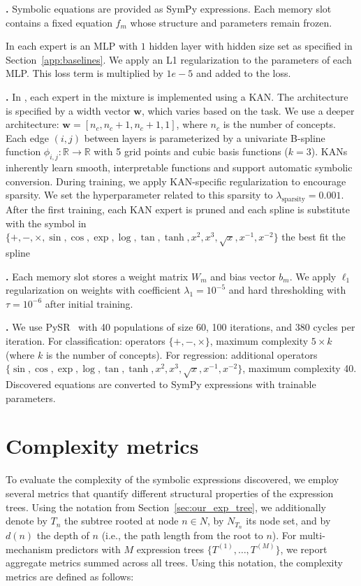 \documentclass{article}
\theoremstyle{plain}
\theoremstyle{definition}
\theoremstyle{remark}
\newcommand{\mypar}[1]{\noindent\textbf{#1}}
\begin{document}
\mypar{\prior{}.}
Symbolic equations are provided as SymPy expressions. Each memory slot contains a fixed equation $f_m$ whose structure and parameters remain frozen. 


\mypar{\mlp}
In \mlp{} each expert is an MLP with $1$ hidden layer with hidden size set as specified in Section~\ref{app:baselines}. We apply an L1 regularization to the parameters of each MLP. This loss term is multiplied by $1e-5$ and added to the loss.

\mypar{\kan.}
In \kan{}, each expert in the mixture is implemented using a KAN. The architecture is specified by a width vector $\mathbf{w}$, which varies based on the task. We use a deeper architecture: $\mathbf{w} = [n_c, n_c+1, n_c+1, 1]$, where $n_c$ is the number of concepts. Each edge $(i,j)$ between layers is parameterized by a univariate B-spline function $\phi_{i,j}: \mathbb{R} \rightarrow \mathbb{R}$ with 5 grid points and cubic basis functions ($k=3$). KANs inherently learn smooth, interpretable functions and support automatic symbolic conversion. During training, we apply KAN-specific regularization to encourage sparsity. We set the hyperparameter related to this sparsity to $\lambda_{\text{sparsity}}=0.001$. After the first training, each KAN expert is pruned and each spline is substitute with the symbol in $\{+,-,\times,\sin, \cos, \exp, \log, \tan, \tanh, x^2, x^3, \sqrt{x}, x^{-1}, x^{-2}\}$ the best fit the spline

\mypar{\linearacro{}.}
Each memory slot stores a weight matrix $W_m$ and bias vector $b_m$. We apply $\ell_1$ regularization on weights with coefficient $\lambda_1 = 10^{-5}$ and hard thresholding with $\tau = 10^{-6}$ after initial training.

\mypar{\symbolicacro{}.}
We use PySR~\citep{cranmer2023interpretable} with 40 populations of size 60, 100 iterations, and 380 cycles per iteration. For classification: operators $\{+, -, \times\}$, maximum complexity $5 \times k$ (where $k$ is the number of concepts). For regression: additional operators $\{\sin, \cos, \exp, \log, \tan, \tanh, x^2, x^3, \sqrt{x}, x^{-1}, x^{-2}\}$, maximum complexity 40. Discovered equations are converted to SymPy expressions with trainable parameters.


\section{Complexity metrics}
\label{app:complexity}

To evaluate the complexity of the symbolic expressions discovered, we employ several metrics that quantify different structural properties of the expression trees. Using the notation from Section~\ref{sec:our_exp_tree}, we additionally denote by $T_n$ the subtree rooted at node $n \in N$, by $N_{T_n}$ its node set, and by $d(n)$ the depth of $n$ (i.e., the path length from the root to $n$). For multi-mechanism predictors with $M$ expression trees $\{T^{(1)}, \ldots, T^{(M)}\}$, we report aggregate metrics summed across all trees. Using this notation, the complexity metrics are defined as follows:
\end{document}
